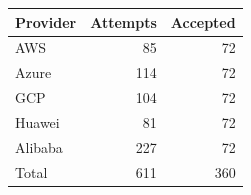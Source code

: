 \begin{tabular}{lrr}
\toprule
Provider & Attempts & Accepted \\
\midrule
AWS & 85 & 72 \\
Azure & 114 & 72 \\
GCP & 104 & 72 \\
Huawei & 81 & 72 \\
Alibaba & 227 & 72 \\
\midrule
Total & 611 & 360 \\
\bottomrule
\end{tabular}
